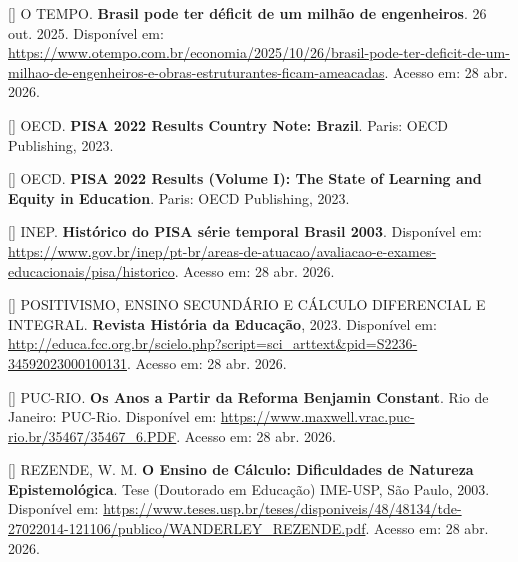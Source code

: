 \documentclass[12pt,a4paper,oneside]{article}
\begin{document}
\begin{singlespace}
\noindent\hangindent=1.25cm
[\theequation\label{ref:otempo-deficit}]
O TEMPO. \textbf{Brasil pode ter déficit de um milhão de
engenheiros}. 26 out. 2025. Disponível em:
\url{https://www.otempo.com.br/economia/2025/10/26/brasil-pode-ter-deficit-de-um-milhao-de-engenheiros-e-obras-estruturantes-ficam-ameacadas}.
Acesso em: 28 abr. 2026.\par\smallskip

\noindent\hangindent=1.25cm
[\theequation\label{ref:pisa-brasil-2022}]
OECD. \textbf{PISA 2022 Results \textendash{} Country Note: Brazil}.
Paris: OECD Publishing, 2023.\par\smallskip

\noindent\hangindent=1.25cm
[\theequation\label{ref:pisa-2022-vol1}]
OECD. \textbf{PISA 2022 Results (Volume I): The State of Learning
and Equity in Education}. Paris: OECD Publishing, 2023.\par\smallskip

\noindent\hangindent=1.25cm
[\theequation\label{ref:pisa-historico-inep}]
INEP. \textbf{Histórico do PISA \textemdash{} série temporal Brasil
2003}. Disponível em:
\url{https://www.gov.br/inep/pt-br/areas-de-atuacao/avaliacao-e-exames-educacionais/pisa/historico}.
Acesso em: 28 abr. 2026.\par\smallskip

\noindent\hangindent=1.25cm
[\theequation\label{ref:positivismo-cdi}]
POSITIVISMO, ENSINO SECUNDÁRIO E CÁLCULO DIFERENCIAL E INTEGRAL.
\textbf{Revista História da Educação}, 2023. Disponível em:
\url{http://educa.fcc.org.br/scielo.php?script=sci_arttext&pid=S2236-34592023000100131}.
Acesso em: 28 abr. 2026.\par\smallskip

\noindent\hangindent=1.25cm
[\theequation\label{ref:reforma-constant}]
PUC-RIO. \textbf{Os Anos a Partir da Reforma Benjamin Constant}.
Rio de Janeiro: PUC-Rio. Disponível em:
\url{https://www.maxwell.vrac.puc-rio.br/35467/35467_6.PDF}.
Acesso em: 28 abr. 2026.\par\smallskip

\noindent\hangindent=1.25cm
[\theequation\label{ref:rezende-calculo}]
REZENDE, W. M. \textbf{O Ensino de Cálculo: Dificuldades de
Natureza Epistemológica}. Tese (Doutorado em Educação)
\textemdash{} IME-USP, São Paulo, 2003. Disponível em:
\url{https://www.teses.usp.br/teses/disponiveis/48/48134/tde-27022014-121106/publico/WANDERLEY_REZENDE.pdf}.
Acesso em: 28 abr. 2026.\par\smallskip


\end{singlespace}
\end{document}

